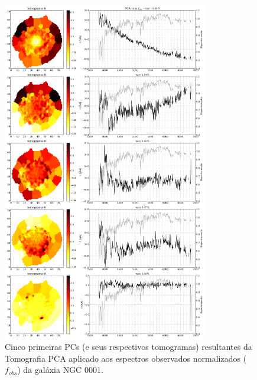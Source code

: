\begin{figure}
    \includegraphics[width=0.8\textwidth]{figuras/K0008-tomo-obs-norm.pdf}
    \caption[Tomogramas de 1 a 5 para o cubo $f_{obs}$ - NGC 0001.]
    {Cinco primeiras PCs (e seus respectivos tomogramas) resultantes da Tomografia PCA aplicado aos espectros observados
    normalizados ($f_{obs}$) da galáxia NGC 0001.}
    \label{fig:K0008tomofobsnorm}
\end{figure}


